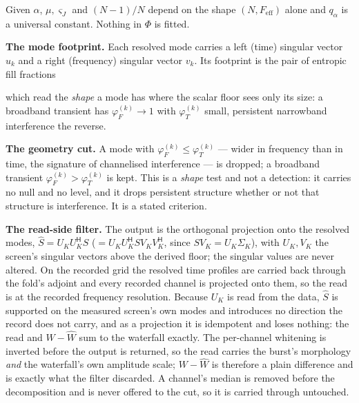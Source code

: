 \documentclass[10pt,letterpaper,twocolumn]{article}
\begin{document}
Given \(\alpha\), \(\mu,\varsigma_J\) and \((N-1)/N\) depend on the shape \((N,F_{\mathrm{eff}})\) alone and \(q_\alpha\) is a universal constant. Nothing in \(\Phi\) is fitted.

\textbf{The mode footprint.} Each resolved mode carries a left (time) singular vector \(u_k\) and a right (frequency) singular vector \(v_k\). Its footprint is the pair of entropic fill fractions


which read the \emph{shape} a mode has where the scalar floor sees only its size: a broadband transient has \(\varphi^{(k)}_F\to1\) with \(\varphi^{(k)}_T\) small, persistent narrowband interference the reverse.

\textbf{The geometry cut.} A mode with \(\varphi^{(k)}_F\le\varphi^{(k)}_T\) --- wider in frequency than in time, the signature of channelised interference --- is dropped; a broadband transient \(\varphi^{(k)}_F>\varphi^{(k)}_T\) is kept. This is a \emph{shape} test and not a detection: it carries no null and no level, and it drops persistent structure whether or not that structure is interference. It is a stated criterion.

\textbf{The read-side filter.} The output is the orthogonal projection onto the resolved modes, \(\widehat S=U_KU_K^{\mathsf H}S\) (\(=U_KU_K^{\mathsf H}SV_KV_K^{\mathsf H}\), since \(SV_K=U_K\Sigma_K\)), with \(U_K,V_K\) the screen's singular vectors above the derived floor; the singular values are never altered. On the recorded grid the resolved time profiles are carried back through the fold's adjoint and every recorded channel is projected onto them, so the read is at the recorded frequency resolution. Because \(U_K\) is read from the data, \(\widehat S\) is supported on the measured screen's own modes and introduces no direction the record does not carry, and as a projection it is idempotent and loses nothing: the read and \(W-\widehat W\) sum to the waterfall exactly. The per-channel whitening is inverted before the output is returned, so the read carries the burst's morphology \emph{and} the waterfall's own amplitude scale; \(W-\widehat W\) is therefore a plain difference and is exactly what the filter discarded. A channel's median is removed before the decomposition and is never offered to the cut, so it is carried through untouched.
\end{document}
